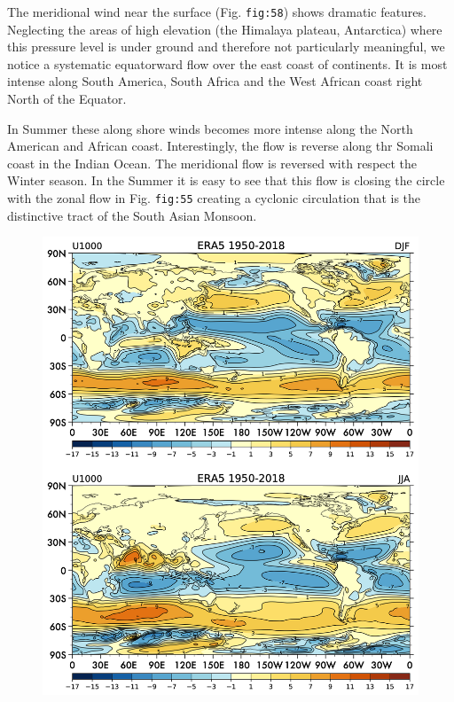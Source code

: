 The meridional wind near the surface (Fig. \texttt{fig:58}) shows
dramatic features. Neglecting the areas of high elevation (the Himalaya
plateau, Antarctica) where this pressure level is under ground and
therefore not particularly meaningful, we notice a systematic
equatorward flow over the east coast of continents. It is most intense
along South America, South Africa and the West African coast right North
of the Equator.

In Summer these along shore winds becomes more intense along the North
American and African coast. Interestingly, the flow is reverse along thr
Somali coast in the Indian Ocean. The meridional flow is reversed with
respect the Winter season. In the Summer it is easy to see that this
flow is closing the circle with the zonal flow in Fig. \texttt{fig:55}
creating a cyclonic circulation that is the distinctive tract of the
South Asian Monsoon.

\begin{figure}
\centering
\includegraphics[width = .7 \textwidth]{figs/GD/U1000.png}
\caption{}\label{}
\end{figure}

